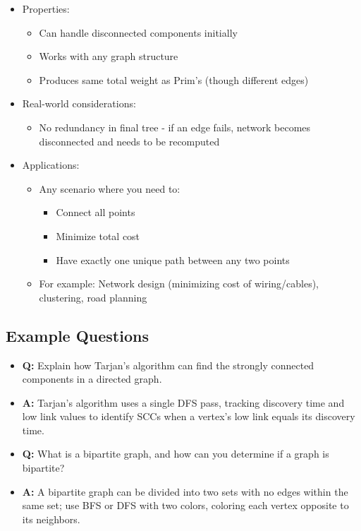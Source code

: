 \documentclass[11pt,a4paper]{article}
\begin{document}
\begin{multicols}{2}
\begin{itemize}
    \item Properties:
    \begin{itemize}
        \item Can handle disconnected components initially
        \item Works with any graph structure
        \item Produces same total weight as Prim's (though different edges)
    \end{itemize}
    \item Real-world considerations:
    \begin{itemize}
        \item No redundancy in final tree - if an edge fails, network becomes disconnected and needs to be recomputed
    \end{itemize}
    \item Applications:
    \begin{itemize}
        \item Any scenario where you need to:
        \begin{itemize}
            \item Connect all points
            \item Minimize total cost
            \item Have exactly one unique path between any two points
        \end{itemize}
        \item For example: Network design (minimizing cost of wiring/cables), clustering, road planning
    \end{itemize}
\end{itemize}

\subsection{Example Questions}
\begin{itemize}
    \item \textbf{Q:} Explain how Tarjan's algorithm can find the strongly connected components in a directed graph.
    \item \textbf{A:} Tarjan's algorithm uses a single DFS pass, tracking discovery time and low link values to identify SCCs when a vertex's low link equals its discovery time.

    \item \textbf{Q:} What is a bipartite graph, and how can you determine if a graph is bipartite?
    \item \textbf{A:} A bipartite graph can be divided into two sets with no edges within the same set; use BFS or DFS with two colors, coloring each vertex opposite to its neighbors.


\end{itemize}
\end{multicols}
\end{document}

